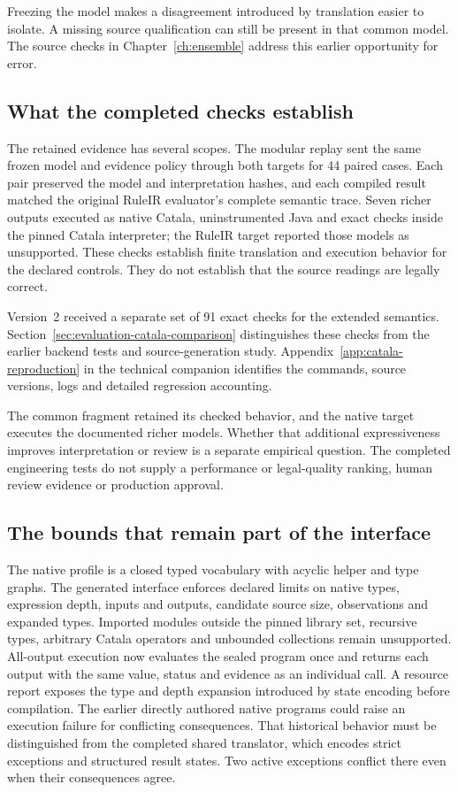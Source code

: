 Freezing the model makes a disagreement introduced by translation easier to
isolate. A missing source qualification can still be present in that common
model. The source checks in Chapter~\ref{ch:ensemble} address this earlier
opportunity for error.

\subsection{What the completed checks establish}
\label{sec:implementation-catala-evidence}

The retained evidence has several scopes. The modular replay sent the same
frozen model and evidence policy through both targets for 44 paired cases. Each
pair preserved the model and interpretation hashes, and each compiled result
matched the original RuleIR evaluator's complete semantic trace. Seven richer
outputs executed as native Catala, uninstrumented Java and exact checks inside
the pinned Catala interpreter; the RuleIR target reported those models as
unsupported. These checks establish finite translation and execution behavior
for the declared controls. They do not establish that the source readings are
legally correct.

Version~2 received a separate set of 91 exact checks for the extended semantics.
Section~\ref{sec:evaluation-catala-comparison} distinguishes these checks from
the earlier backend tests and source-generation study.
Appendix~\ref{app:catala-reproduction} in the technical companion identifies
the commands, source versions, logs and detailed regression accounting.

The common fragment retained its checked behavior, and the native target
executes the documented richer models. Whether that additional expressiveness
improves interpretation or review is a separate empirical question. The
completed engineering tests do not supply a performance or legal-quality
ranking, human review evidence or production approval.

\subsection{The bounds that remain part of the interface}
\label{sec:implementation-catala-bounds}

The native profile is a closed typed vocabulary with acyclic helper and type
graphs. The generated interface enforces declared limits on native types,
expression depth, inputs and outputs, candidate source size, observations and
expanded types. Imported modules outside the pinned library set, recursive
types, arbitrary Catala operators and unbounded collections remain unsupported.
All-output execution now evaluates the sealed program once and returns each
output with the same value, status and evidence as an individual call. A resource
report exposes the type and depth expansion introduced by state encoding before
compilation. The earlier directly
authored native programs could raise an execution failure for conflicting
consequences. That historical behavior must be distinguished from the completed
shared translator, which encodes strict exceptions and structured result states.
Two active exceptions conflict there even when their consequences agree.

